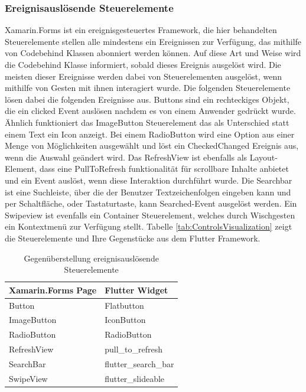 \subsubsection{Ereignisauslösende  Steuerelemente}
Xamarin.Forms ist ein ereignisgesteuertes Framework,  die hier behandelten Steuerelemente stellen alle mindestens ein Ereignissen zur Verfügung,  das mithilfe von Codebehind Klassen abonniert werden können.  Auf diese Art und Weise wird die Codebehind Klasse informiert, sobald dieses Ereignis ausgelöst wird.  Die meisten dieser Ereignisse werden dabei von Steuerelementen ausgelöst, wenn mithilfe von Gesten mit ihnen interagiert wurde.  Die folgenden Steuerelemente lösen dabei die folgenden Ereignisse aus.  \glq Buttons\grq{}  sind ein rechteckiges Objekt,  die ein \glq clicked\grq{}  Event auslösen nachdem es von einem Anwender gedrückt wurde. Ähnlich funktioniert das \glq ImageButton\grq{}  Steuerelement das als Unterschied statt einem Text ein Icon anzeigt.  Bei einem \glq RadioButton\grq{}  wird eine Option aus einer Menge von Möglichkeiten ausgewählt und löst ein \glq CheckedChanged\grq{}  Ereignis aus, wenn die Auswahl geändert wird.  Das \glq RefreshView\grq{}  ist ebenfalls als Layout-Element, dass eine \glq PullToRefresh\grq{}  funktionalität für scrollbare Inhalte anbietet und ein Event auslöst, wenn diese Interaktion durchführt wurde.  Die \glq Searchbar\grq{}  ist eine Suchleiste, über die der Benutzer Textzeichenfolgen eingeben kann und per Schaltfläche, oder Tastaturtaste,  kann \glq Searched-Event\grq{} ausgelöst werden.  Ein \glq Swipeview\grq{}  ist evenfalls ein Container Steuerelement, welches durch Wischgesten ein Kontextmenü zur Verfügung stellt. 
Tabelle \ref{tab:ControlsVisualization} zeigt die Steuerelemente und Ihre Gegenstücke aus dem Flutter Framework. 
\begin{table}[!ht]
\begin{tabularx}{\textwidth}{X|X}
   \textbf{Xamarin.Forms Page} & \textbf{Flutter Widget}  \\
\hline
	Button		       				&  	Flatbutton 		\\ 
	ImageButton		       		&  	IconButton 		\\ 
	RadioButton		       		&  	RadioButton 		\\ 
	RefreshView		       		&  	pull\_to\_refresh 		\\ 
	SearchBar		       			&  	flutter\_search\_bar 	\\ 
	SwipeView		       		&  	flutter\_slideable 		\\ 
\end{tabularx}
\caption{Gegenüberstellung ereignisauslösende Steuerelemente}
 \label{tab:eventcommands}
\end{table}

